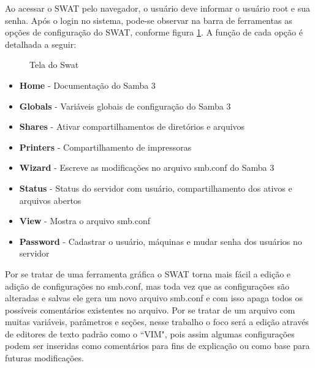 Ao acessar o SWAT pelo navegador, o usuário deve informar o usuário root e sua senha. Após o login no sistema, pode-se observar na barra de ferramentas as opções de configuração do SWAT, conforme figura \ref{swat}. A função de cada opção é detalhada a seguir:

\begin{figure}[ht]
   	\centering
   	\caption{Tela do Swat}
    \label{swat}
\end{figure}

\begin{itemize}
    \item \textbf{Home} - Documentação do Samba 3
    \item \textbf{Globals} - Variáveis globais de configuração do Samba 3
    \item \textbf{Shares} - Ativar compartilhamentos de diretórios e arquivos
    \item \textbf{Printers} - Compartilhamento de impressoras
    \item \textbf{Wizard} - Escreve as modificações no arquivo smb.conf do Samba 3
    \item \textbf{Status} - Status do servidor com usuário, compartilhamento dos ativos e arquivos abertos
    \item \textbf{View} - Mostra o arquivo smb.conf
    \item \textbf{Password} - Cadastrar o usuário, máquinas e mudar senha dos usuários no servidor
\end{itemize}

Por se tratar de uma ferramenta gráfica o SWAT torna mais fácil a edição e adição de configurações no smb.conf, mas toda vez que as configurações são alteradas e salvas ele gera um novo arquivo smb.conf e com isso apaga todos os possíveis comentários existentes no arquivo. Por se tratar de um arquivo com muitas variáveis, parâmetros e seções, nesse trabalho o foco será a edição através de editores de texto padrão como o ``VIM", pois assim algumas configurações podem ser inseridas como comentários para fins de explicação ou como base para futuras modificações.

